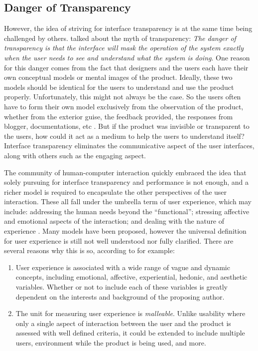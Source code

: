 \documentclass[a4paper,titlepage]{article}
\begin{document}
\subsection{Danger of Transparency}
However, the idea of striving for interface transparency is at the
same time being challenged by others. \citet{windows:bolter} talked
about the myth of transparency: \textit{The danger of transparency is
  that the interface will mask the operation of the system exactly
  when the user needs to see and understand what the system is
  doing}. One reason for this danger comes from the fact that
designers and the users each have their own conceptual models or
mental images of the product. Ideally, these two models should be
identical for the users to understand and use the product
properly. Unfortunately, this might not always be the case. So the
users often have to form their own model exclusively from the
observation of the product, whether from the exterior guise, the
feedback provided, the responses from blogger, documentations, etc
\citet{design:norman}. But if the product was invisible or transparent
to the users, how could it act as a medium to help the users to
understand itself? Interface transparency eliminates the communicative
aspect of the user interfaces, along with others such as the engaging
aspect.

The community of human-computer interaction quickly embraced the idea
that solely pursuing for interface transparency and performance is not
enough, and a richer model is required to encapsulate the other
perspectives of the user interaction. These all fall under the
umbrella term of user experience, which may include: addressing the
human needs beyond the ``functional''; stressing affective and
emotional aspects of the interaction; and dealing with the nature of
experience \citep{ux:hassenzahl}. Many models have been proposed,
however the universal definition for user experience is still not well
understood nor fully clarified. There are several reasons why this is
so, according to \citet{ux:law} for example:
\begin{enumerate}
  \item User experience is associated with a wide range of vague and
    dynamic concepts, including emotional, affective, experiential,
    hedonic, and aesthetic variables. Whether or not to include each
    of these variables is greatly dependent on the interests and
    background of the proposing author.
  \item The unit for measuring user experience is
    \textit{malleable}. Unlike usability where only a single aspect of
    interaction between the user and the product is assessed with well
    defined criteria, it could be extended to include multiple users,
    environment while the product is being used, and more.
\end{enumerate}
\end{document}
